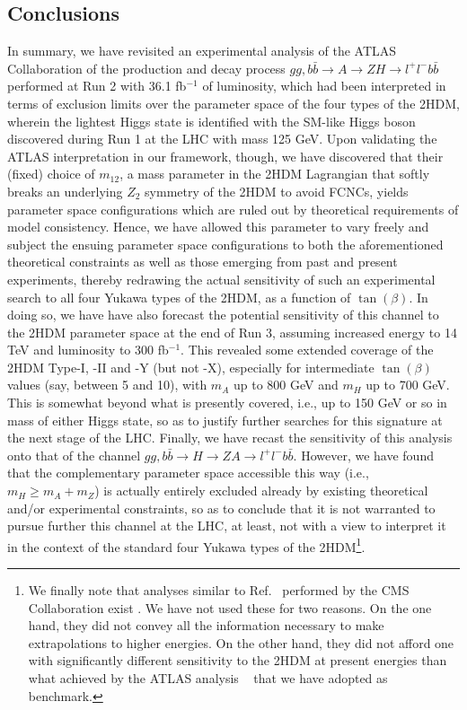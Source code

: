 \subsection{Conclusions}
In summary, we have revisited an experimental analysis of the ATLAS Collaboration of the production and decay process $gg,b\bar b\to A\to ZH\to l^+l^-b\bar b$ performed at Run 2 with 36.1 fb$^{-1}$ of luminosity, which had been interpreted in terms of exclusion limits over the parameter space of the four types of the 2HDM, wherein the lightest Higgs state is identified with the SM-like Higgs boson discovered during Run 1 at the LHC with mass 125 GeV. Upon validating the ATLAS interpretation in our framework, though, we have discovered that their (fixed) choice of $m_{12}$, a mass parameter in the 2HDM Lagrangian that softly breaks an underlying $Z_2$ symmetry of the 2HDM to avoid FCNCs, yields parameter space configurations which are ruled out by theoretical requirements of model consistency. Hence, we have allowed this parameter to vary freely and subject the ensuing parameter space configurations to both the aforementioned theoretical constraints as well as those emerging from past and present experiments, thereby redrawing the actual sensitivity of such an experimental search to all four Yukawa types of the 2HDM, as a function of $\tan(\beta)$. In doing so, we have have also forecast the potential sensitivity of this channel to the 2HDM parameter space at the end of Run 3, assuming increased energy to 14 TeV and luminosity to 300 fb$^{-1}$.
This revealed some extended coverage of the 2HDM Type-I, -II and -Y (but not -X),
especially for intermediate $\tan(\beta)$ values (say, between  5 and 10), with $m_A$ up to 800 GeV and $m_H$ up to 700 GeV.
This is somewhat beyond what is presently covered, i.e.,  up to 150 GeV or so in mass of either Higgs state, so as to justify further searches for this signature at the next stage of the LHC. Finally, we have recast the sensitivity of this analysis onto that of the channel  $gg,b\bar b\to H\to ZA\to l^+l^-b\bar b$. However, we have found that the complementary parameter space accessible this way (i.e., $m_H\ge  m_A+m_Z$) is actually entirely excluded already by existing theoretical and/or experimental constraints, so as to conclude that it is not warranted to pursue further this channel at the LHC, at least, not with a view to interpret it in the context of the standard four Yukawa types of the 2HDM\footnote{We finally note that analyses similar to Ref.~\cite{Aaboud2018AZHbbll}
performed by the CMS Collaboration exist \cite{Khachatryan2016resonancesbbtautau,Sirunyan2020newneutral}. We have not used these for two reasons. On the one hand, they did not convey all the  information necessary to make  extrapolations to higher energies. On the other hand, they did not afford one with significantly different sensitivity to the 2HDM at present energies than what achieved by the ATLAS analysis ~\cite{Aaboud2018AZHbbll} that we have adopted as benchmark.}.

